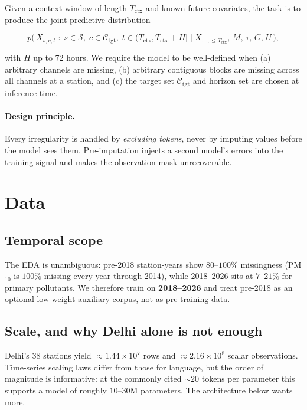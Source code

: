 \documentclass[11pt,a4paper]{article}
\newcommand{\Sset}{\mathcal{S}}
\newcommand{\Cset}{\mathcal{C}}
\begin{document}
Given a context window of length $T_{\text{ctx}}$ and known-future covariates,
the task is to produce the joint predictive distribution

\begin{equation}
p\big(\, X_{s,c,t} \;:\; s\in\Sset,\; c\in\Cset_{\text{tgt}},\; t\in (T_{\text{ctx}}, T_{\text{ctx}}+H] \;\big|\; X_{\cdot,\cdot,\le T_{\text{ctx}}},\, M,\, \tau,\, G,\, U \,\big),
\end{equation}

with $H$ up to 72 hours. We require the model to be well-defined when
(a) arbitrary channels are missing, (b) arbitrary contiguous blocks are missing
across all channels at a station, and (c) the target set $\Cset_{\text{tgt}}$ and
horizon set are chosen at inference time.

\paragraph{Design principle.} Every irregularity is handled by \emph{excluding
tokens}, never by imputing values before the model sees them. Pre-imputation
injects a second model's errors into the training signal and makes the
observation mask unrecoverable.

\section{Data}

\subsection{Temporal scope}

The EDA is unambiguous: pre-2018 station-years show $80$--$100\%$ missingness
(PM$_{10}$ is $100\%$ missing every year through 2014), while 2018--2026 sits at
$7$--$21\%$ for primary pollutants. We therefore train on \textbf{2018--2026} and
treat pre-2018 as an optional low-weight auxiliary corpus, not as pre-training
data.

\subsection{Scale, and why Delhi alone is not enough}

Delhi's 38 stations yield $\approx 1.44\times 10^{7}$ rows and
$\approx 2.16\times 10^{8}$ scalar observations. Time-series scaling laws differ
from those for language, but the order of magnitude is informative: at the
commonly cited $\sim\!20$ tokens per parameter this supports a model of roughly
$10$--$30$M parameters. The architecture below wants more.
\end{document}
